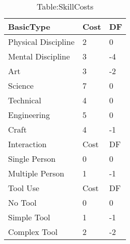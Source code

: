 
\begin{table}[h]
	\begin{tabular}{lll}
    BasicType           & Cost          & DF \\
	\hline
    Physical Discipline            &  2          &  0 \\
    Mental Discipline              &  3           & -4 \\
    Art                            &  3           & -2 \\
    Science                        &  7          &  0 \\
    Technical                      &  4          &  0 \\
    Engineering                    &  5          &  0 \\
    Craft                          &  4           & -1 \\
	\hline
    Interaction                    & Cost          & DF \\
	\hline
    Single Person                  &  0          &  0 \\
    Multiple Person                &  1           & -1 \\
	\hline
    Tool Use                       & Cost          & DF \\
	\hline
    No Tool                        &  0          &  0 \\
    Simple Tool                    &  1           & -1 \\
    Complex Tool                   &  2           & -2 \\
    \end{tabular}
    \caption{Table:SkillCosts}
\end{table}




